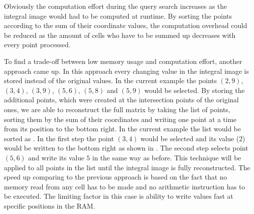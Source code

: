 Obviously the computation effort during the query search increases as the integral image would had to be computed at runtime. By sorting the points according to the sum of their coordinate values, the computation overhead could be reduced as the amount of cells who have to be summed up decreases with every point processed.

%
%

To find a trade-off between low memory usage and computation effort, another approach came up. In this approach every changing value in the integral image is stored instead of the original values. In the current example the points $(2,9)$, $(3,4)$, $(3,9)$, $(5,6)$, $(5,8)$ and $(5,9)$ would be selected. By storing the additional points, which were created at the intersection points of the original ones, we are able to reconstruct the full matrix by taking the list of points, sorting them by the sum of their coordinates and writing one point at a time from its position to the bottom right. In the current example the list would be sorted as . In the first step the point $(3,4)$ would be selected and its value ($2$) would be written to the bottom right as shown in . The second step selects point $(5,6)$ and write its value $5$ in the same way as before.
This technique will be applied to all points in the list until the integral image is fully reconstructed.
The speed up comparing to the previous approach is based on the fact that no memory read from any cell has to be made and no arithmetic instruction has to be executed. The limiting factor in this case is ability to write values fast at specific positions in the \ac{RAM}.

